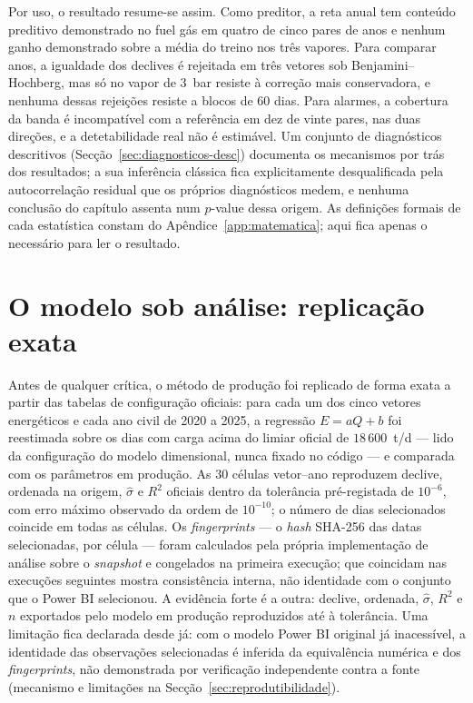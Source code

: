 Por uso, o resultado resume-se assim. Como preditor, a reta anual tem
conteúdo preditivo demonstrado no fuel gás em quatro de cinco pares de
anos e nenhum ganho demonstrado sobre a média do treino nos três vapores.
Para comparar anos, a igualdade dos declives é rejeitada em três vetores
sob Benjamini--Hochberg, mas só no vapor de 3~bar resiste à correção mais
conservadora, e nenhuma dessas rejeições resiste a blocos de 60 dias. Para
alarmes, a cobertura da banda é incompatível com a referência em dez de
vinte pares, nas duas direções, e a detetabilidade real não é estimável. Um
conjunto de diagnósticos descritivos (Secção~\ref{sec:diagnosticos-desc})
documenta os mecanismos por trás dos resultados; a sua inferência clássica
fica explicitamente desqualificada pela autocorrelação residual que os
próprios diagnósticos medem, e nenhuma conclusão do capítulo assenta num
$p$-value dessa origem. As definições formais de cada estatística constam do
Apêndice~\ref{app:matematica}; aqui fica apenas o necessário para ler o
resultado.

\section{O modelo sob análise: replicação exata}
\label{sec:replicacao}

Antes de qualquer crítica, o método de produção foi replicado de forma exata a
partir das tabelas de configuração oficiais: para cada um dos cinco vetores
energéticos e cada ano civil de 2020 a 2025, a regressão $E = aQ + b$ foi
reestimada sobre os dias com carga acima do limiar oficial de
$18\,600$~t/d --- lido da configuração do modelo dimensional, nunca fixado no
código --- e comparada com os parâmetros em produção. As 30 células
vetor--ano reproduzem declive, ordenada na origem, $\hat\sigma$ e $R^2$
oficiais dentro da tolerância pré-registada de
$10^{-6}$, com erro máximo
observado da ordem de $10^{-10}$; o número de dias selecionados coincide
em todas as células. Os \emph{fingerprints} --- o \emph{hash} SHA-256 das datas
selecionadas, por célula --- foram calculados pela própria implementação de
análise sobre o \emph{snapshot} e congelados na primeira execução; que
coincidam nas execuções seguintes mostra consistência interna, não
identidade com o conjunto que o Power BI selecionou. A evidência forte é a
outra: declive, ordenada, $\hat\sigma$, $R^2$ e $n$ exportados pelo modelo em
produção reproduzidos até à tolerância. Uma limitação fica declarada desde
já: com o modelo Power BI original já
inacessível, a identidade das observações selecionadas é inferida da
equivalência numérica e dos \emph{fingerprints}, não demonstrada por
verificação independente contra a fonte
(mecanismo e limitações na Secção~\ref{sec:reprodutibilidade}).


